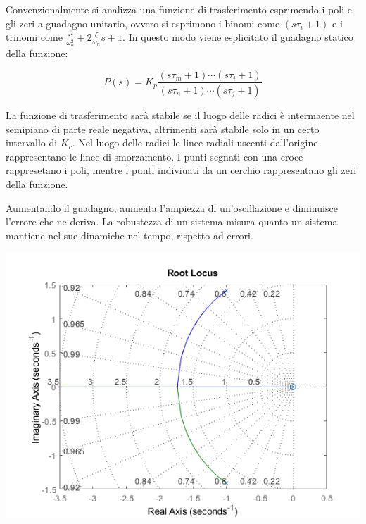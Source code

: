 \documentclass{article}
\numberwithin{equation}{subsection}
\begin{document}
Convenzionalmente si analizza una funzione di trasferimento esprimendo i poli e gli zeri a guadagno unitario, ovvero si esprimono i binomi come $(s\tau_i+1)$ e i trinomi 
come $\displaystyle\frac{s^2}{\omega_n^2}+2\frac{\zeta}{\omega_n}s+1$. In questo modo viene esplicitato il guadagno statico della funzione:

\begin{equation}
    P(s)=K_p\displaystyle\frac{(s\tau_m+1)\cdots(s\tau_i+1)}{(s\tau_n+1)\cdots(s\tau_j+1)}
\end{equation}



La funzione di trasferimento sarà stabile se il luogo delle radici è intermaente nel semipiano di parte reale negativa, altrimenti sarà stabile solo 
in un certo intervallo di $K_c$. Nel luogo delle radici le linee radiali uscenti dall'origine rappresentano le linee di smorzamento. 
I punti segnati con una croce rappresetano i poli, mentre i punti indiviuati da un cerchio rappresentano gli zeri della funzione.


Aumentando il guadagno, aumenta l'ampiezza di un'oscillazione e diminuisce l'errore che ne deriva. La robustezza di un sistema misura quanto un sistema mantiene nel sue 
dinamiche nel tempo, rispetto ad errori. 

\begin{center}
    \includegraphics[scale=0.55]{rlocus}
\end{center}
\end{document}
